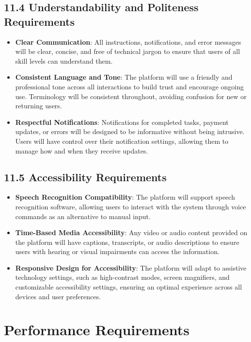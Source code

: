 \documentclass[12pt]{article}
\begin{document}
\subsection*{11.4 Understandability and Politeness Requirements}
\begin{itemize}[leftmargin=2cm]
    \item \textbf{Clear Communication}: All instructions, notifications, and error messages will be clear, concise, and free of technical jargon to ensure that users of all skill levels can understand them.
    \item \textbf{Consistent Language and Tone}: The platform will use a friendly and professional tone across all interactions to build trust and encourage ongoing use. Terminology will be consistent throughout, avoiding confusion for new or returning users.
    \item \textbf{Respectful Notifications}: Notifications for completed tasks, payment updates, or errors will be designed to be informative without being intrusive. Users will have control over their notification settings, allowing them to manage how and when they receive updates.
\end{itemize}

\subsection*{11.5 Accessibility Requirements}
\begin{itemize}[leftmargin=2cm]
    \item \textbf{Speech Recognition Compatibility}: The platform will support speech recognition software, allowing users to interact with the system through voice commands as an alternative to manual input.
    \item \textbf{Time-Based Media Accessibility}: Any video or audio content provided on the platform will have captions, transcripts, or audio descriptions to ensure users with hearing or visual impairments can access the information.
    \item \textbf{Responsive Design for Accessibility}: The platform will adapt to assistive technology settings, such as high-contrast modes, screen magnifiers, and customizable accessibility settings, ensuring an optimal experience across all devices and user preferences.
\end{itemize}

\section{Performance Requirements}
\end{document}
